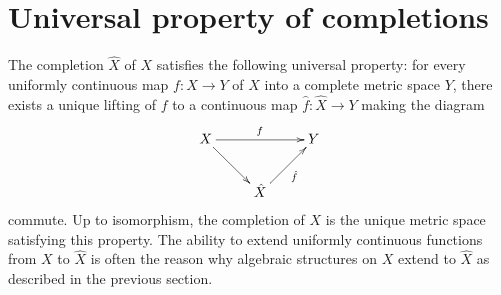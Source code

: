 \documentclass[12pt]{article}
\newcommand{\lra}{\longrightarrow}
\begin{document}
\section{Universal property of completions}

The completion $\hat{X}$ of $X$ satisfies the following universal property: for every uniformly continuous map $f: X \lra Y$ of $X$ into a complete metric space $Y$, there exists a unique lifting of $f$ to a continuous map $\hat{f}: \hat{X} \lra Y$ making the diagram
$$
\xymatrix{
X \ar[rr]^f \ar[dr] & & Y \\
& \hat{X} \ar[ur]_{\hat{f}}
}
$$
commute. Up to isomorphism, the completion of $X$ is the unique metric space satisfying this property. The ability to extend uniformly continuous functions from $X$ to $\hat{X}$ is often the reason why algebraic structures on $X$ extend to $\hat{X}$ as described in the previous section.
\end{document}

